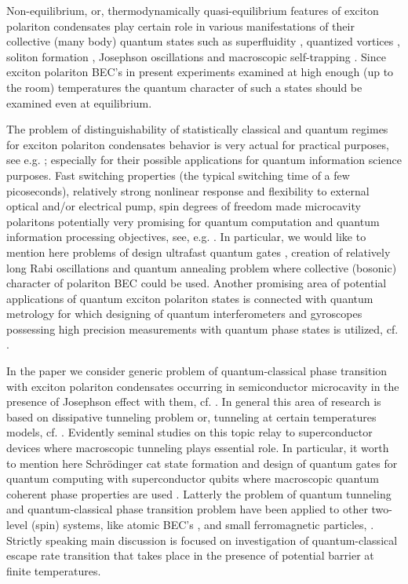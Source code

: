 \documentclass[aps, pre, preprint, groupedaddress, superscriptaddress, showkeys, showpacs] {revtex4-1}
\begin{document}
Non-equilibrium, or, thermodynamically quasi-equilibrium features of exciton polariton condensates play certain role in various manifestations of their collective (many body) quantum states such as superfluidity \cite{12,13}, quantized vortices \cite{14,15}, soliton formation \cite{16}, Josephson oscillations and macroscopic self-trapping \cite{17,18}.
Since exciton polariton BEC's in present experiments examined at high enough (up to the room) temperatures the quantum character of such a states should be examined even at equilibrium.

The problem of distinguishability of statistically classical and quantum regimes for exciton polariton condensates behavior is very actual for practical purposes, see e.g. \cite{19}; especially for their possible applications for quantum information science purposes.
Fast switching properties (the typical switching time of a few picoseconds), relatively strong nonlinear response and flexibility to external optical and/or electrical pump, spin degrees of freedom made microcavity polaritons potentially very promising for quantum computation and quantum information processing objectives, see, e.g. \cite{21,22,23}. In particular, we would like to mention here problems of design ultrafast quantum gates \cite{22,23}, creation of relatively long Rabi oscillations \cite{19, 20} and quantum annealing problem \cite{24} where collective (bosonic) character of polariton BEC could be used.
Another promising area of potential applications of quantum exciton polariton states is connected with quantum metrology for which designing of quantum interferometers and gyroscopes possessing high precision measurements with quantum phase states is utilized, cf. \cite{25, 26}.
  
In the paper we consider generic problem of quantum-classical phase transition with exciton polariton condensates occurring in semiconductor microcavity in the presence of Josephson effect with them, cf. \cite{27}.
In general this area of research is based on dissipative tunneling problem or, tunneling at certain temperatures models, cf. \cite{28,29,30}.
Evidently seminal studies on this topic relay to superconductor devices \cite{31} where macroscopic tunneling plays essential role.
In particular, it worth to mention here Schr\"odinger cat state formation \cite{32} and design of quantum gates for quantum computing with superconductor qubits where macroscopic quantum coherent phase properties are used \cite{33}.
Latterly the problem of quantum tunneling and quantum-classical phase transition problem have been applied to other two-level (spin) systems, like atomic BEC's \cite{34}, and small ferromagnetic particles, \cite{35}.
Strictly speaking main discussion is focused on investigation of quantum-classical escape rate transition that takes place in the presence of potential barrier at finite temperatures.
  
\end{document}
